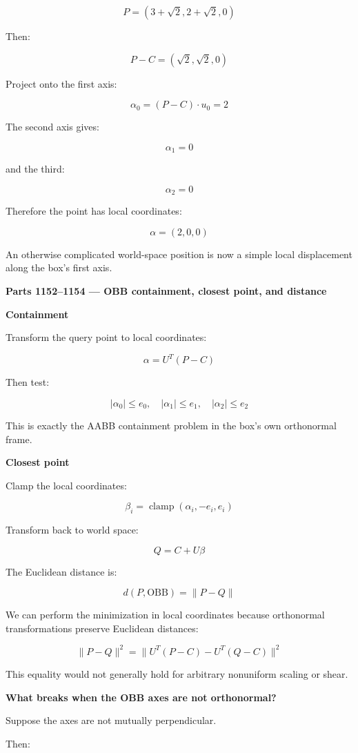 \[
P=(3+\sqrt2,2+\sqrt2,0)
\]

Then:

\[
P-C=(\sqrt2,\sqrt2,0)
\]

Project onto the first axis:

\[
\alpha_0=(P-C)\cdot u_0=2
\]

The second axis gives:

\[
\alpha_1=0
\]

and the third:

\[
\alpha_2=0
\]

Therefore the point has local coordinates:

\[
\boxed{\alpha=(2,0,0)}
\]

An otherwise complicated world-space position is now a simple local displacement along the box's first axis.

\textbf{Parts 1152--1154 --- OBB containment, closest point, and distance}

\textbf{Containment}

Transform the query point to local coordinates:

\[
\alpha=U^T(P-C)
\]

Then test:

\[
\boxed{ |\alpha_0|\le e_0,\quad |\alpha_1|\le e_1,\quad |\alpha_2|\le e_2 }
\]

This is exactly the AABB containment problem in the box's own orthonormal frame.

\textbf{Closest point}

Clamp the local coordinates:

\[
\beta_i=\operatorname{clamp}(\alpha_i,-e_i,e_i)
\]

Transform back to world space:

\[
\boxed{ Q=C+U\beta }
\]

The Euclidean distance is:

\[
\boxed{ d(P,\mathrm{OBB})=\|P-Q\| }
\]

We can perform the minimization in local coordinates because orthonormal transformations preserve Euclidean distances:

\[
\|P-Q\|^2= \|U^T(P-C)-U^T(Q-C)\|^2
\]

This equality would not generally hold for arbitrary nonuniform scaling or shear.

\textbf{What breaks when the OBB axes are not orthonormal?}

Suppose the axes are not mutually perpendicular.

Then:

